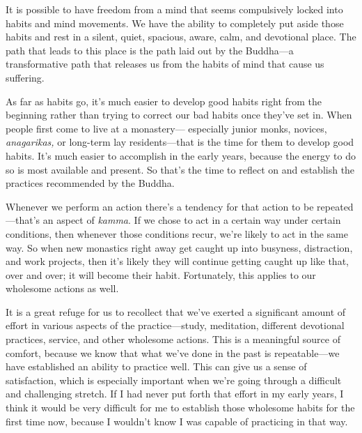 
It is possible to have freedom from a mind that seems compulsively 
locked into habits and mind movements. We have the ability to 
completely put aside those habits and rest in a silent, quiet, 
spacious, aware, calm, and devotional place. The path that leads to 
this place is the path laid out by the Buddha---a transformative path 
that releases us from the habits of mind that cause us suffering.

As far as habits go, it's much easier to develop good habits right from 
the beginning rather than trying to correct our bad habits once they've 
set in. When people first come to live at a monastery--- especially 
junior monks, novices, \emph{anagarikas,} or long-term lay 
residents---that is the time for them to develop good habits. It's much 
easier to accomplish in the early years, because the energy to do so is 
most available and present. So that's the time to reflect on and 
establish the practices recommended by the Buddha.

Whenever we perform an action there's a tendency for that action to be 
repeated---that's an aspect of \emph{kamma}. If we chose to act in a 
certain way under certain conditions, then whenever those conditions 
recur, we're likely to act in the same way. So when new monastics right 
away get caught up into busyness, distraction, and work projects, then 
it's likely they will continue getting caught up like that, over and 
over; it will become their habit. Fortunately, this applies to our 
wholesome actions as well.

It is a great refuge for us to recollect that we've exerted a 
significant amount of effort in various aspects of the 
practice---study, meditation, different devotional practices, service, 
and other wholesome actions. This is a meaningful source of comfort, 
because we know that what we've done in the past is repeatable---we 
have established an ability to practice well. This can give us a sense 
of satisfaction, which is especially important when we're going through 
a difficult and challenging stretch. If I had never put forth that 
effort in my early years, I think it would be very difficult for me to 
establish those wholesome habits for the first time now, because I 
wouldn't know I was capable of practicing in that way.

